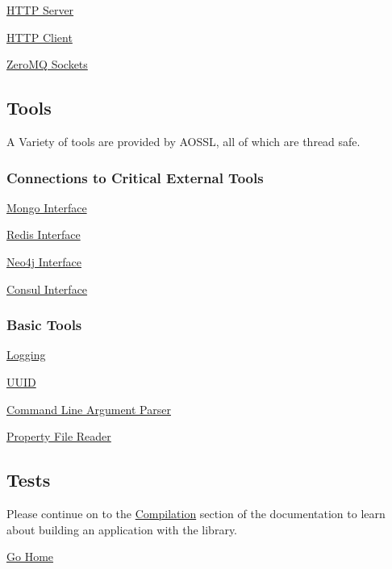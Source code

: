 \begin{DoxyItemize}
\item \hyperlink{http_server}{H\+T\+TP Server}
\item \hyperlink{http_client}{H\+T\+TP Client}
\item \hyperlink{zeromq}{Zero\+MQ Sockets}
\end{DoxyItemize}

\subsection*{Tools}

A Variety of tools are provided by A\+O\+S\+SL, all of which are thread safe.

\subsubsection*{Connections to Critical External Tools}


\begin{DoxyItemize}
\item \hyperlink{mongo}{Mongo Interface}
\item \hyperlink{redis}{Redis Interface}
\item \hyperlink{neo4j}{Neo4j Interface}
\item \hyperlink{consul}{Consul Interface}
\end{DoxyItemize}

\subsubsection*{Basic Tools}


\begin{DoxyItemize}
\item \hyperlink{logging}{Logging}
\item \hyperlink{uuid}{U\+U\+ID}
\item \hyperlink{cli}{Command Line Argument Parser}
\item \hyperlink{props}{Property File Reader}
\end{DoxyItemize}

\subsection*{Tests}

Please continue on to the \hyperlink{compilation}{Compilation} section of the documentation to learn about building an application with the library.

\hyperlink{index}{Go Home} 